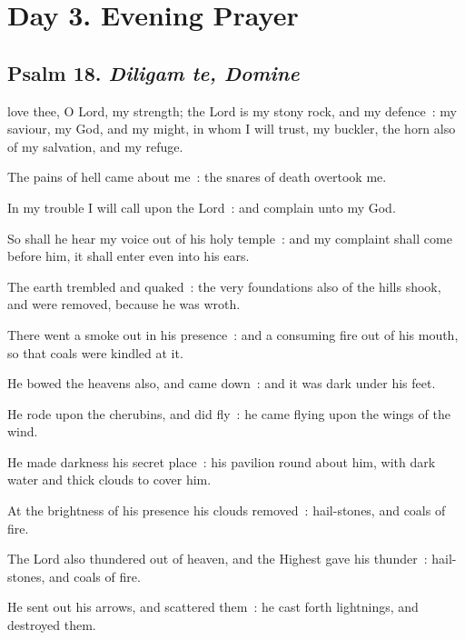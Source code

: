 \clearpage
\section*{Day 3. Evening Prayer}

\subsection{Psalm 18. \textit{Diligam te, Domine}}

 love thee, O Lord, my strength; the Lord is my stony rock, and my defence~: my saviour, my God, and my might, in whom I will trust, my buckler, the horn also of my salvation, and my refuge.\par
{}
The pains of hell came about me~: the snares of death overtook me.\par
{}In my trouble I will call upon the Lord~: and complain unto my God.\par
{}So shall he hear my voice out of his holy temple~: and my complaint shall come before him, it shall enter even into his ears.\par
{}The earth trembled and quaked~: the very foundations also of the hills shook, and were removed, because he was wroth.\par
{}There went a smoke out in his presence~: and a consuming fire out of his mouth, so that coals were kindled at it.\par
{}He bowed the heavens also, and came down~: and it was dark under his feet.\par
{}He rode upon the cherubins, and did fly~: he came flying upon the wings of the wind.\par
{}He made darkness his secret place~: his pavilion round about him, with dark water and thick clouds to cover him.\par
{}At the brightness of his presence his clouds removed~: hail-stones, and coals of fire.\par
{}The Lord also thundered out of heaven, and the Highest gave his thunder~: hail-stones, and coals of fire.\par
{}He sent out his arrows, and scattered them~: he cast forth lightnings, and destroyed them.\par
